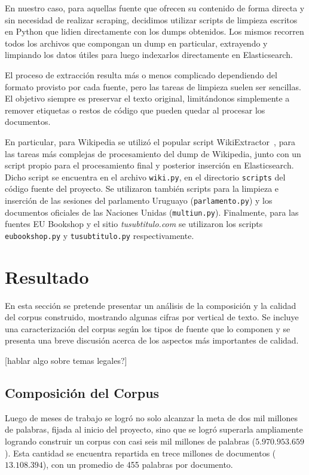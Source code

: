 En nuestro caso, para aquellas fuente que ofrecen su contenido de forma directa y sin necesidad
de realizar scraping, decidimos utilizar scripts de limpieza escritos en Python que lidien directamente
con los dumps obtenidos. Los mismos recorren todos los archivos que compongan un dump en
particular, extrayendo y limpiando los datos útiles para luego indexarlos directamente en Elasticsearch.

El proceso de extracción resulta más o menos complicado dependiendo del formato provisto por cada
fuente, pero las tareas de limpieza suelen ser sencillas. El objetivo siempre es preservar el texto
original, limitándonos simplemente a remover etiquetas o restos de código que pueden quedar al
procesar los documentos.

En particular, para Wikipedia se utilizó el popular script WikiExtractor~\cite{WikiExtractor}, para las
tareas más complejas de procesamiento del dump de Wikipedia, junto con un script propio para el procesamiento
final y posterior inserción en Elasticsearch. Dicho script se encuentra en el archivo \texttt{wiki.py},
en el directorio \texttt{scripts} del código fuente del proyecto. Se utilizaron también scripts para la
limpieza e inserción de las sesiones del parlamento Uruguayo (\texttt{parlamento.py}) y los documentos
oficiales de las Naciones Unidas (\texttt{multiun.py}). Finalmente, para las fuentes EU Bookshop y el
sitio \textit{tusubtitulo.com} se utilizaron los scripts \texttt{eubookshop.py} y \texttt{tusubtitulo.py}
respectivamente.


\section{Resultado}

En esta sección se pretende presentar un análisis de la composición y la calidad del corpus
construido, mostrando algunas cifras por vertical de texto. Se incluye una caracterización del
corpus según los tipos de fuente que lo componen y se presenta una breve discusión acerca de los
aspectos más importantes de calidad.


[hablar algo sobre temas legales?]


\subsection{Composición del Corpus}

Luego de meses de trabajo se logró no solo alcanzar la meta de dos mil millones de palabras,
fijada al inicio del proyecto, sino que se logró superarla ampliamente logrando construir un
corpus con casi seis mil millones de palabras ($5.970.953.659$). Esta cantidad se encuentra
repartida en trece millones de documentos ($13.108.394$), con un promedio de 455 palabras
por documento.

